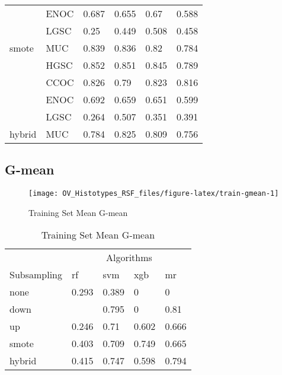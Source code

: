 \documentclass[
]{report}
\begin{document}
\begin{table}
\begin{tabular}[t]{l|l|l|l|l|l}
\cline{2-6}
 & ENOC & 0.687 & 0.655 & 0.67 & 0.588\\
\cline{2-6}
 & LGSC & 0.25 & 0.449 & 0.508 & 0.458\\
\cline{2-6}
\multirow{-5}{*}{\raggedright\arraybackslash smote} & MUC & 0.839 & 0.836 & 0.82 & 0.784\\
\cline{1-6}
 & HGSC & 0.852 & 0.851 & 0.845 & 0.789\\
\cline{2-6}
 & CCOC & 0.826 & 0.79 & 0.823 & 0.816\\
\cline{2-6}
 & ENOC & 0.692 & 0.659 & 0.651 & 0.599\\
\cline{2-6}
 & LGSC & 0.264 & 0.507 & 0.351 & 0.391\\
\cline{2-6}
\multirow{-5}{*}{\raggedright\arraybackslash hybrid} & MUC & 0.784 & 0.825 & 0.809 & 0.756\\
\hline
\end{tabular}
\end{table}

\subsection{G-mean}\label{g-mean}

\begin{figure}[H]

{\centering \texttt{[image: OV\_Histotypes\_RSF\_files/figure-latex/train-gmean-1]} 

}

\caption{Training Set Mean G-mean}\label{fig:train-gmean}
\end{figure}

\begin{table}

\caption{\label{tab:train-gmean-table}Training Set Mean G-mean}
\centering
\begin{tabular}[t]{l|l|l|l|l}
\hline
\multicolumn{1}{c|}{ } & \multicolumn{4}{c}{Algorithms} \\
\cline{2-5}
Subsampling & rf & svm & xgb & mr\\
\hline
none & 0.293 & 0.389 & 0 & 0\\
\hline
down & \cellcolor[HTML]{90ee90}{0.815} & 0.795 & 0 & 0.81\\
\hline
up & 0.246 & 0.71 & 0.602 & 0.666\\
\hline
smote & 0.403 & 0.709 & 0.749 & 0.665\\
\hline
hybrid & 0.415 & 0.747 & 0.598 & 0.794\\
\hline
\end{tabular}
\end{table}
\end{document}
